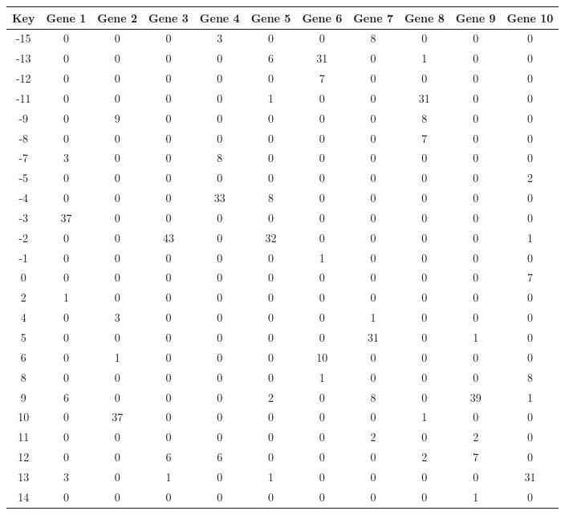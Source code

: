 \begin{tabular}{|c|c|c|c|c|c|c|c|c|c|c|}
\hline
Key & Gene 1 & Gene 2 & Gene 3 & Gene 4 & Gene 5 & Gene 6 & Gene 7 & Gene 8 & Gene 9 & Gene 10 \\
\hline
-15 & 0 & 0 & 0 & 3 & 0 & 0 & 8 & 0 & 0 & 0 \\
-13 & 0 & 0 & 0 & 0 & 6 & 31 & 0 & 1 & 0 & 0 \\
-12 & 0 & 0 & 0 & 0 & 0 & 7 & 0 & 0 & 0 & 0 \\
-11 & 0 & 0 & 0 & 0 & 1 & 0 & 0 & 31 & 0 & 0 \\
-9 & 0 & 9 & 0 & 0 & 0 & 0 & 0 & 8 & 0 & 0 \\
-8 & 0 & 0 & 0 & 0 & 0 & 0 & 0 & 7 & 0 & 0 \\
-7 & 3 & 0 & 0 & 8 & 0 & 0 & 0 & 0 & 0 & 0 \\
-5 & 0 & 0 & 0 & 0 & 0 & 0 & 0 & 0 & 0 & 2 \\
-4 & 0 & 0 & 0 & 33 & 8 & 0 & 0 & 0 & 0 & 0 \\
-3 & 37 & 0 & 0 & 0 & 0 & 0 & 0 & 0 & 0 & 0 \\
-2 & 0 & 0 & 43 & 0 & 32 & 0 & 0 & 0 & 0 & 1 \\
-1 & 0 & 0 & 0 & 0 & 0 & 1 & 0 & 0 & 0 & 0 \\
0 & 0 & 0 & 0 & 0 & 0 & 0 & 0 & 0 & 0 & 7 \\
2 & 1 & 0 & 0 & 0 & 0 & 0 & 0 & 0 & 0 & 0 \\
4 & 0 & 3 & 0 & 0 & 0 & 0 & 1 & 0 & 0 & 0 \\
5 & 0 & 0 & 0 & 0 & 0 & 0 & 31 & 0 & 1 & 0 \\
6 & 0 & 1 & 0 & 0 & 0 & 10 & 0 & 0 & 0 & 0 \\
8 & 0 & 0 & 0 & 0 & 0 & 1 & 0 & 0 & 0 & 8 \\
9 & 6 & 0 & 0 & 0 & 2 & 0 & 8 & 0 & 39 & 1 \\
10 & 0 & 37 & 0 & 0 & 0 & 0 & 0 & 1 & 0 & 0 \\
11 & 0 & 0 & 0 & 0 & 0 & 0 & 2 & 0 & 2 & 0 \\
12 & 0 & 0 & 6 & 6 & 0 & 0 & 0 & 2 & 7 & 0 \\
13 & 3 & 0 & 1 & 0 & 1 & 0 & 0 & 0 & 0 & 31 \\
14 & 0 & 0 & 0 & 0 & 0 & 0 & 0 & 0 & 1 & 0 \\
\hline
\end{tabular}